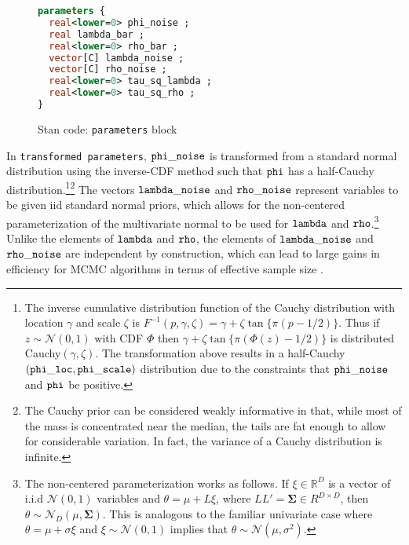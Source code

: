 \begin{figure}[h]
\begin{lstlisting}[language=Stan, frame=trBL]
parameters {
  real<lower=0> phi_noise ;    
  real lambda_bar ;  
  real<lower=0> rho_bar ; 
  vector[C] lambda_noise ;      
  vector[C] rho_noise ;
  real<lower=0> tau_sq_lambda ;  
  real<lower=0> tau_sq_rho ;
}
\end{lstlisting}
\caption{Stan code: {\tt parameters} block}
\label{stan_parameters}
\end{figure}

In {\tt transformed parameters}, ${\tt phi\_noise}$ is transformed from a standard normal 
distribution using the inverse-CDF method such that ${\tt phi}$ has a half-Cauchy 
distribution.\footnote{
The inverse cumulative distribution function of the Cauchy distribution with location $\gamma$ 
and scale $\zeta$ is $F^{-1}(p, \gamma,\zeta)  = \gamma + \zeta \tan{\{ \pi (p - 1/2)\}}$. Thus if 
$z \sim \mathcal{N}(0,1)$ with CDF $\Phi$ then $\gamma + \zeta \tan{\{ \pi (\Phi(z) - 1/2)\}}$ is 
distributed Cauchy$(\gamma, \zeta)$. The transformation above results in a half-Cauchy$({\tt phi\_loc}, 
{\tt phi\_scale})$ distribution due to the constraints that ${\tt phi\_noise}$ and ${\tt phi}$ be positive.}\footnote{
The Cauchy prior can be considered weakly informative in that, while most of the mass is concentrated 
near the median, the tails are fat enough to allow for considerable variation. In fact, the variance of a 
Cauchy distribution is infinite.} The vectors ${\tt lambda\_noise}$ and ${\tt rho\_noise}$ represent variables 
to be given iid standard normal priors, which allows for the non-centered parameterization of the 
multivariate normal to be used for ${\tt lambda}$ and ${\tt rho}$.\footnote{
The non-centered parameterization works as follows. If $\xi \in \mathbb{R}^D$ is a vector of i.i.d 
$\mathcal{N}(0,1)$ variables and $\theta = \mu + L \xi$, where 
$LL' = \boldsymbol{\Sigma} \in R^{D \times D}$, then $\theta \sim \mathcal{N}_D (\mu, \boldsymbol{\Sigma})$.
This is analogous to the familiar univariate case where $\theta = \mu + \sigma \xi$ and 
$\xi \sim \mathcal{N}(0,1)$ implies that $\theta \sim \mathcal{N}(\mu, \sigma^2)$.} Unlike the elements 
of ${\tt lambda}$ and ${\tt rho}$, the elements of ${\tt lambda\_noise}$ and ${\tt rho\_noise}$ are 
independent by construction, which can lead to large gains in efficiency for MCMC algorithms in 
terms of effective sample size . 

